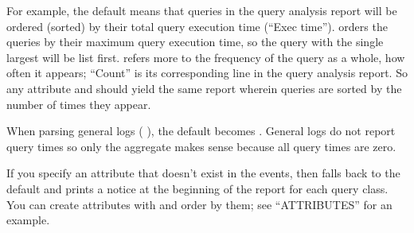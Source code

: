 \documentclass[letterpaper,10pt,english]{sphinxmanual}
\begin{document}
\begin{fulllineitems}
For example, the default  means that queries in the
query analysis report will be ordered (sorted) by their total query execution
time (“Exec time”).   orders the queries by their
maximum query execution time, so the query with the single largest
 will be list first.   refers more to the frequency
of the query as a whole, how often it appears; “Count” is its corresponding
line in the query analysis report.  So any attribute and  should yield
the same report wherein queries are sorted by the number of times they
appear.

When parsing general logs ({\hyperref[\detokenize{mariadb-query-digest:cmdoption-mariadb-query-digest-type}]{}} ), the default {\hyperref[\detokenize{mariadb-query-digest:cmdoption-mariadb-query-digest-order-by}]{}}
becomes .  General logs do not report query times so only
the  aggregate makes sense because all query times are zero.

If you specify an attribute that doesn’t exist in the events, then
 falls back to the default  and prints a notice
at the beginning of the report for each query class.  You can create attributes
with {\hyperref[\detokenize{mariadb-query-digest:cmdoption-mariadb-query-digest-filter}]{}} and order by them; see “ATTRIBUTES” for an example.

\end{fulllineitems}

\end{document}
